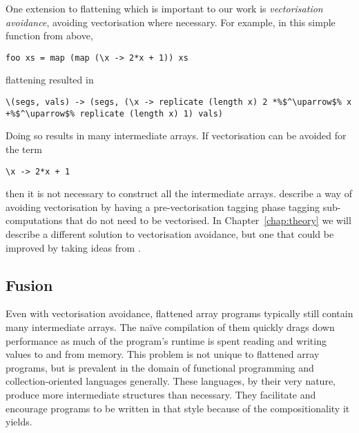 One extension to flattening which is important to our work is \emph{vectorisation avoidance}, avoiding vectorisation where necessary. For example, in this simple function from above,
%
\begin{lstlisting}
foo xs = map (map (\x -> 2*x + 1)) xs
\end{lstlisting}
%
flattening resulted in
%
%
\begin{lstlisting}
\(segs, vals) -> (segs, (\x -> replicate (length x) 2 *%$^\uparrow$% x +%$^\uparrow$% replicate (length x) 1) vals)
\end{lstlisting}
%
Doing so results in many intermediate arrays. If vectorisation can be avoided for the term
%
\begin{lstlisting}
\x -> 2*x + 1
\end{lstlisting}
%
then it is not necessary to construct all the intermediate arrays. \citet{Keller:avoidance} describe a way of avoiding vectorisation by having a pre-vectorisation tagging phase tagging sub-computations that do not need to be vectorised. In Chapter~\ref{chap:theory} we will describe a different solution to vectorisation avoidance, but one that could be improved by taking ideas from \citet{Keller:avoidance}.

\subsection{Fusion}
\label{sec:fusion}


Even with vectorisation avoidance, flattened array programs typically still contain many intermediate arrays. The na\"ive compilation of them quickly drags down performance as much of the program's runtime is spent reading and writing values to and from memory. This problem is not unique to flattened array programs, but is prevalent in the domain of functional programming and  collection-oriented languages generally. These languages, by their very nature, produce more intermediate structures than necessary. They facilitate and encourage programs to be written in that style because of the compositionality it yields.

